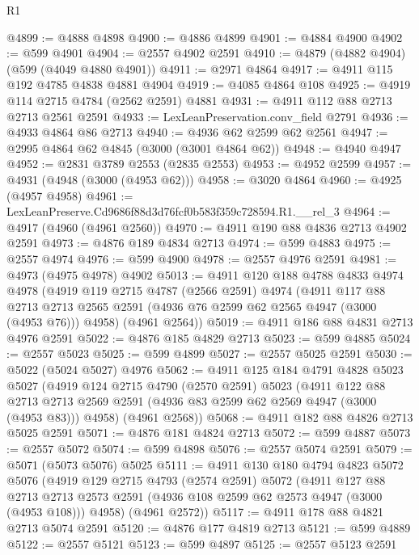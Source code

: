 \begin{lexlean}{R1}
\begin{coremodule}
@4899 := @4888 @4898
@4900 := @4886 @4899
@4901 := @4884 @4900
@4902 := @599 @4901
@4904 := @2557 @4902 @2591
@4910 := @4879 (@4882 @4904) (@599 (@4049 @4880 @4901))
@4911 := @2971 @4864
@4917 := @4911 @115 @192 @4785 @4838 @4881 @4904
@4919 := @4085 @4864 @108
@4925 := @4919 @114 @2715 @4784 (@2562 @2591) @4881
@4931 := @4911 @112 @88 @2713 @2713 @2561 @2591
@4933 := LexLeanPreservation.conv_field @2791
@4936 := @4933 @4864 @86 @2713
@4940 := @4936 @62 @2599 @62 @2561
@4947 := @2995 @4864 @62 @4845 (@3000 (@3001 @4864 @62))
@4948 := @4940 @4947
@4952 := @2831 @3789 @2553 (@2835 @2553)
@4953 := @4952 @2599
@4957 := @4931 (@4948 (@3000 (@4953 @62)))
@4958 := @3020 @4864
@4960 := @4925 (@4957 @4958)
@4961 := LexLeanPreserve.Cd9686f88d3d76fcf0b583f359c728594.R1.__rel_3
@4964 := @4917 (@4960 (@4961 @2560))
@4970 := @4911 @190 @88 @4836 @2713 @4902 @2591
@4973 := @4876 @189 @4834 @2713
@4974 := @599 @4883
@4975 := @2557 @4974
@4976 := @599 @4900
@4978 := @2557 @4976 @2591
@4981 := @4973 (@4975 @4978) @4902
@5013 := @4911
    @120
    @188
    @4788
    @4833
    @4974
    @4978
    (@4919
      @119
      @2715
      @4787
      (@2566 @2591)
      @4974
      (@4911
        @117
        @88
        @2713
        @2713
        @2565
        @2591
        (@4936 @76 @2599 @62 @2565 @4947 (@3000 (@4953 @76)))
        @4958)
      (@4961 @2564))
@5019 := @4911 @186 @88 @4831 @2713 @4976 @2591
@5022 := @4876 @185 @4829 @2713
@5023 := @599 @4885
@5024 := @2557 @5023
@5025 := @599 @4899
@5027 := @2557 @5025 @2591
@5030 := @5022 (@5024 @5027) @4976
@5062 := @4911
    @125
    @184
    @4791
    @4828
    @5023
    @5027
    (@4919
      @124
      @2715
      @4790
      (@2570 @2591)
      @5023
      (@4911
        @122
        @88
        @2713
        @2713
        @2569
        @2591
        (@4936 @83 @2599 @62 @2569 @4947 (@3000 (@4953 @83)))
        @4958)
      (@4961 @2568))
@5068 := @4911 @182 @88 @4826 @2713 @5025 @2591
@5071 := @4876 @181 @4824 @2713
@5072 := @599 @4887
@5073 := @2557 @5072
@5074 := @599 @4898
@5076 := @2557 @5074 @2591
@5079 := @5071 (@5073 @5076) @5025
@5111 := @4911
    @130
    @180
    @4794
    @4823
    @5072
    @5076
    (@4919
      @129
      @2715
      @4793
      (@2574 @2591)
      @5072
      (@4911
        @127
        @88
        @2713
        @2713
        @2573
        @2591
        (@4936 @108 @2599 @62 @2573 @4947 (@3000 (@4953 @108)))
        @4958)
      (@4961 @2572))
@5117 := @4911 @178 @88 @4821 @2713 @5074 @2591
@5120 := @4876 @177 @4819 @2713
@5121 := @599 @4889
@5122 := @2557 @5121
@5123 := @599 @4897
@5125 := @2557 @5123 @2591

\end{coremodule}
\end{lexlean}
